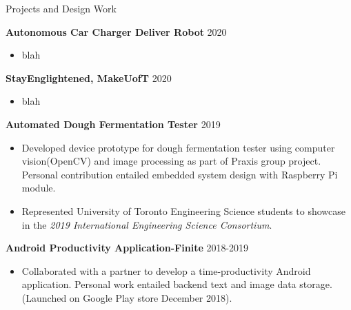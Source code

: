 \documentclass{my_resume} %
\begin{document}
\begin{minipage}[t]{0.66\textwidth} 




    \begin{rSection}{Projects and Design Work}    
        
        {\bf Autonomous Car Charger Deliver Robot} \hfill{2020}
             \begin{itemize}
                \item blah
            \end{itemize} 

        {\bf StayEnglightened, MakeUofT} \hfill{2020}
            \begin{itemize}
                \item blah
            \end{itemize} 
        
        {\bf Automated Dough Fermentation Tester} \hfill{2019}
        \begin{itemize}
            \item Developed device prototype for dough fermentation tester using computer vision(OpenCV) and image processing as part of Praxis group project. Personal contribution entailed embedded system design with Raspberry Pi module. 
            \item Represented University of Toronto Engineering Science students to showcase in the \emph{2019 International Engineering Science Consortium}. 
        \end{itemize}
            
        {\bf Android Productivity Application-Finite} \hfill{2018-2019} 
        \begin{itemize}
            \item Collaborated with a partner to develop a time-productivity Android application. Personal work entailed backend text and image data storage. (Launched on Google Play store December 2018).
            
        \end{itemize}


    \end{rSection}



\end{minipage}
\end{document}

